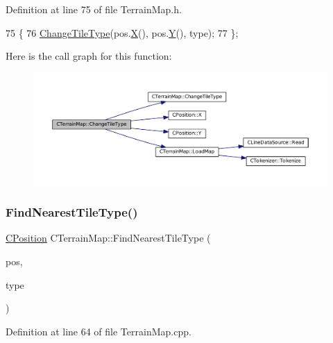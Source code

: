Definition at line 75 of file Terrain\+Map.\+h.


\begin{DoxyCode}
75                                                                  \{
76             \hyperlink{classCTerrainMap_a40757d66d7458620a327d6f69a35a2bd}{ChangeTileType}(pos.\hyperlink{classCPosition_a9a6b94d3b91df1492d166d9964c865fc}{X}(), pos.\hyperlink{classCPosition_a1aa8a30e2f08dda1f797736ba8c13a87}{Y}(), type);
77         \};
\end{DoxyCode}
Here is the call graph for this function\+:\nopagebreak
\begin{figure}[H]
\begin{center}
\leavevmode
\includegraphics[width=350pt]{classCTerrainMap_a4a4f26c13a3d8116f4295bef3c25c3e5_cgraph}
\end{center}
\end{figure}
\hypertarget{classCTerrainMap_af32811cace3a3b01c9519b304ddb8efc}{}\label{classCTerrainMap_af32811cace3a3b01c9519b304ddb8efc} 
\subsubsection{\texorpdfstring{Find\+Nearest\+Tile\+Type()}{FindNearestTileType()}}
{\footnotesize\ttfamily \hyperlink{classCPosition}{C\+Position} C\+Terrain\+Map\+::\+Find\+Nearest\+Tile\+Type (\begin{DoxyParamCaption}\item[{const \hyperlink{classCPosition}{C\+Position} \&}]{pos,  }\item[{\hyperlink{classCTerrainMap_aff2ab991e237269941416dd79d8871d4}{E\+Tile\+Type}}]{type }\end{DoxyParamCaption})}



Definition at line 64 of file Terrain\+Map.\+cpp.


